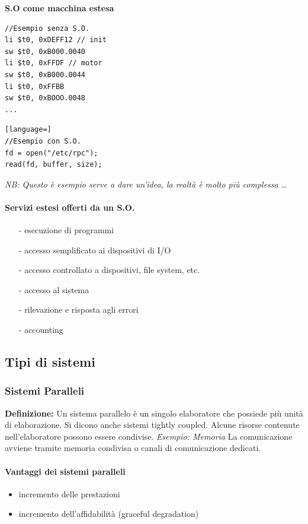 \textbf{S.O come macchina estesa}

\begin{multicols}{2}
   \begin{lstlisting}
//Esempio senza S.O.
li $t0, 0xDEFF12 // init
sw $t0, 0xB000.0040
li $t0, 0xFFDF // motor
sw $t0, 0xB000.0044
li $t0, 0xFFBB
sw $t0, 0xBOOO.0048
...
\end{lstlisting}
    \columnbreak
    \begin{lstlisting}[language=]
//Esempio con S.O.
fd = open("/etc/rpc");
read(fd, buffer, size);
\end{lstlisting}
\end{multicols}

\begin{center}
    \small\textit{NB: Questo è esempio serve a dare un'idea,
la realtà è molto più complessa \dots}
\end{center}

\paragraph{Servizi estesi offerti da un S.O.}
\begin{itemize}
\item[-] esecuzione di programmi
\item[-] accesso semplificato ai dispositivi di I/O
\item[-] accesso controllato a dispositivi, file system, etc.
\item[-] accesso al sistema
\item[-] rilevazione e risposta agli errori
\item[-] accounting
\end{itemize}

\subsection{Tipi di sistemi}

\subsubsection{Sistemi Paralleli}
\textbf{Definizione:} Un sistema parallelo è un singolo elaboratore che possiede più unità di elaborazione. Si dicono anche sistemi tightly coupled.
Alcune risorse contenute nell'elaboratore possono essere condivise.
\textit{Esempio: Memoria}
La comunicazione avviene tramite memoria condivisa o canali di
comunicazione dedicati.

\paragraph{Vantaggi dei sistemi paralleli}
    \begin{itemize}
        \item incremento delle prestazioni
        \item incremento dell’affidabilità (graceful degradation)
    \end{itemize}

